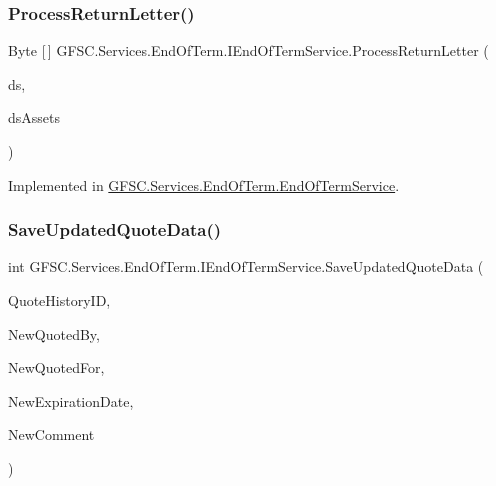 \subsubsection{\texorpdfstring{Process\+Return\+Letter()}{ProcessReturnLetter()}}
{\footnotesize\ttfamily Byte \mbox{[}$\,$\mbox{]} G\+F\+S\+C.\+Services.\+End\+Of\+Term.\+I\+End\+Of\+Term\+Service.\+Process\+Return\+Letter (\begin{DoxyParamCaption}\item[{Data\+Set}]{ds,  }\item[{Data\+Set}]{ds\+Assets }\end{DoxyParamCaption})}



Implemented in \mbox{\hyperlink{class_g_f_s_c_1_1_services_1_1_end_of_term_1_1_end_of_term_service_a333d59240ab862fff560fe3af9a9e1ed}{G\+F\+S\+C.\+Services.\+End\+Of\+Term.\+End\+Of\+Term\+Service}}.

\mbox{\label{interface_g_f_s_c_1_1_services_1_1_end_of_term_1_1_i_end_of_term_service_aa737f02391b7bf664bbd6f0e21f57a64}} 
\subsubsection{\texorpdfstring{Save\+Updated\+Quote\+Data()}{SaveUpdatedQuoteData()}}
{\footnotesize\ttfamily int G\+F\+S\+C.\+Services.\+End\+Of\+Term.\+I\+End\+Of\+Term\+Service.\+Save\+Updated\+Quote\+Data (\begin{DoxyParamCaption}\item[{int}]{Quote\+History\+ID,  }\item[{string}]{New\+Quoted\+By,  }\item[{string}]{New\+Quoted\+For,  }\item[{Date\+Time}]{New\+Expiration\+Date,  }\item[{string}]{New\+Comment }\end{DoxyParamCaption})}



